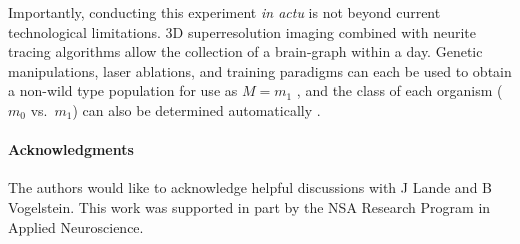 \documentclass{article}
\begin{document}
Importantly, conducting this experiment {\it in actu} is not beyond current technological limitations. 3D superresolution imaging \cite{VaziriShank08} combined with neurite tracing algorithms \cite{HelmstaedterDenk08,Mishchenko09,LuLichtman09} allow the collection of a brain-graph within a day. Genetic manipulations, laser ablations, and training paradigms can each be used to obtain a non-wild type population for use as $M=m_1$ \cite{deBonoMaricq05}, and the class of each organism ($m_0$ vs.~$m_1$) can also be determined automatically \cite{BuckinghamSattelle08}.


\paragraph{Acknowledgments}
The authors would like to acknowledge helpful discussions with J Lande and B Vogelstein. This work was supported in part by the NSA Research Program in Applied Neuroscience.


%
% 

\end{document}
